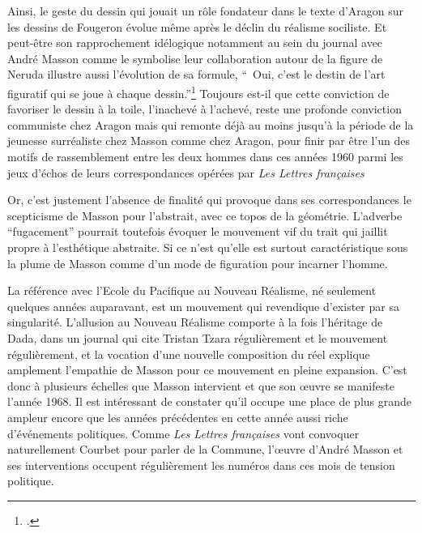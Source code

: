 	\begin{quote}
		
	\end{quote}



Ainsi, le geste du dessin qui jouait un rôle fondateur dans le texte d'Aragon sur les dessins de Fougeron évolue même après le déclin du réalisme sociliste. Et peut-être son rapprochement idélogique notamment au sein du journal avec André Masson comme le symbolise leur collaboration autour de la figure de Neruda illustre aussi l'évolution de sa formule, \enquote{ Oui, c’est le destin de l’art figuratif qui se joue à chaque dessin.}\footcite[p135]{ecritssurla} Toujours est-il que cette conviction de favoriser le dessin à la toile, l'inachevé à l'achevé, reste une profonde conviction communiste chez Aragon mais qui remonte déjà au moins jusqu'à la période de la jeunesse surréaliste chez Masson comme chez Aragon, pour finir par être l'un des motifs de rassemblement entre les deux hommes dans ces années 1960 parmi les jeux d'échos de leurs correspondances opérées par \emph{Les Lettres françaises}

	Or, c’est justement l’absence de finalité qui provoque dans ses correspondances le scepticisme de Masson pour l’abstrait, avec ce topos  de la géométrie. L’adverbe \enquote{fugacement} pourrait toutefois évoquer le mouvement vif du trait qui jaillit propre à l’esthétique abstraite. Si ce n’est qu’elle est surtout caractéristique sous la plume de Masson comme d’un mode de figuration pour incarner l’homme. 

	La référence avec l’Ecole du Pacifique au Nouveau Réalisme, né seulement quelques années auparavant, est un mouvement qui revendique d’exister par sa singularité. L’allusion au Nouveau Réalisme comporte à la fois l’héritage de Dada, dans un journal qui cite Tristan Tzara régulièrement et le mouvement régulièrement, et la vocation d’une nouvelle composition du réel explique amplement l’empathie de Masson pour ce mouvement en pleine expansion. C’est donc à plusieurs échelles que Masson intervient et que son \oe{}uvre se manifeste l’année 1968. Il est intéressant de constater qu’il occupe une place de plus grande ampleur encore que les années précédentes en cette année aussi riche d’événements politiques. Comme \emph{Les Lettres françaises} vont convoquer naturellement Courbet pour parler de la Commune, l’\oe{}uvre d’André Masson et ses interventions occupent régulièrement les numéros dans ces mois de tension politique. 

